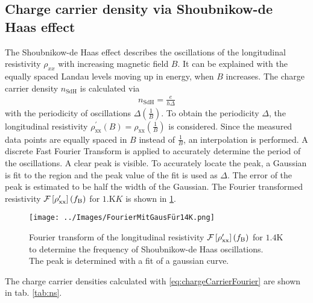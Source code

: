 \subsection{Charge carrier density via Shoubnikow-de Haas effect}
The Shoubnikow-de Haas effect describes the oscillations of the longitudinal resistivity $\rho_{xx}$ with increasing magnetic field $B$.
It can be explained with the equally spaced Landau levels moving up in energy, when $B$ increases.
The charge carrier density $n_\text{SdH}$ is calculated via
\begin{align}
    n_\text{SdH} = \frac{e}{h\Delta}
    \label{eq:chargeCarrierFourier}
\end{align} 
with the periodicity of oscillations $\Delta\left(\frac{1}{B}\right)$.
To obtain the periodicity $\Delta$, the longitudinal resistivity $\rho^\prime_\text{xx}\left(B\right)=\rho_\text{xx}\left(\frac{1}{B}\right)$ is considered.
Since the measured data points are equally spaced in $B$ instead of $\frac{1}{B}$, an interpolation is performed.
A discrete Fast Fourier Transform is applied to accurately determine the period of the oscillations.
A clear peak is visible.
To accurately locate the peak, a Gaussian is fit to the region and the peak value of the fit is used as $\Delta$.
The error of the peak is estimated to be half the width of the Gaussian.
The Fourier transformed resistivity $\mathcal{F}\left[ \rho^\prime_\text{xx}\right]\left(f_\text B\right)$ for $1.\text{K}K$ is shown in \ref{fig:Fourier}.
\begin{figure}[h]
    \centering
    \texttt{[image: ../Images/FourierMitGausFür14K.png]}
    \caption{Fourier transform of the longitudinal resistivity 
    $\mathcal{F}\left[ \rho^\prime_\text{xx}\right]\left(f_\text B\right)$ 
    for $1.4\text{K}$ to determine the frequency of Shoubnikow-de Haas oscillations.\\
    The peak is determined with a fit of a gaussian curve.
    }
    \label{fig:Fourier}
\end{figure}
The charge carrier densities calculated with \ref{eq:chargeCarrierFourier} are shown in tab. \ref{tab:ns}.
